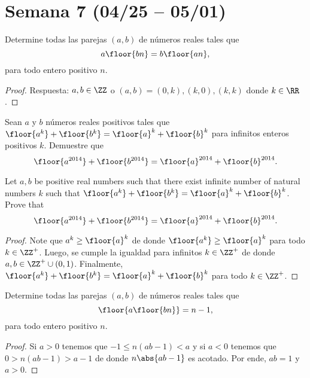 \section{Semana 7 (04/25 -- 05/01)}


\begin{probEG}
  Determine todas las parejas $(a,b)$ de números reales tales que
  \[a\floor{bn}=b\floor{an},\]
  para todo entero positivo $n$.
\end{probEG}

\begin{proof}
  Respuesta: $a,b\in\ZZ$ o $(a,b)=(0,k),(k,0),(k,k)$ donde $k\in\RR$.
\end{proof}

\begin{probEG}
  Sean $a$ y $b$ números reales positivos tales que
  $\floor{a^k}+\floor{b^k}=\floor{a}^k+\floor{b}^k$ para infinitos enteros
  positivos $k$. Demuestre que
  \[\floor{a^{2014}}+\floor{b^{2014}}=\floor{a}^{2014}+\floor{b}^{2014}.\]
  \begin{hint}
    Let $a,b$ be positive real numbers such that there exist infinite number of
    natural numbers $k$ such that
    $\floor{a^k}+\floor{b^k}=\floor{a}^k+\floor{b}^k$. Prove that
    \[\floor{a^{2014}}+\floor{b^{2014}}=\floor{a}^{2014}+\floor{b}^{2014}.\]
  \end{hint}
\end{probEG}

\begin{proof}
  Note que $a^k\ge\floor{a}^k$ de donde $\floor{a^k}\ge\floor{a}^k$ para todo
  $k\in\ZZ^+$. Luego, se cumple la igualdad para infinitos $k\in\ZZ^+$ de donde
  $a,b\in\ZZ^+\cup(0,1)$. Finalmente,
  $\floor{a^k}+\floor{b^k}=\floor{a}^k+\floor{b}^k$ para todo $k\in\ZZ^+$.
\end{proof}

\begin{probEG}
  Determine todas las parejas $(a,b)$ de números reales tales que
  \[\floor{a\floor{bn}}=n-1,\]
  para todo entero positivo $n$.
\end{probEG}

\begin{proof}
  Si $a>0$ tenemos que $-1\le n(ab-1)<a$ y si $a<0$ tenemos que $0>n(ab-1)>a-1$
  de donde $n\abs{ab-1}$ es acotado. Por ende, $ab=1$ y $a>0$.
\end{proof}


